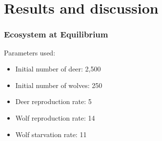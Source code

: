 \documentclass{beamer}
\begin{document}
\section{Results and discussion}
\frame
{
  \frametitle{Ecosystem at Equilibrium}
  Parameters used: 
  \begin{itemize}
  \item{Initial number of deer: 2,500}
  \item{Initial number of wolves: 250}
  \item{Deer reproduction rate: 5}
  \item{Wolf reproduction rate: 14}
  \item{Wolf starvation rate: 11}
  \end{itemize}

  
}
\end{document}
